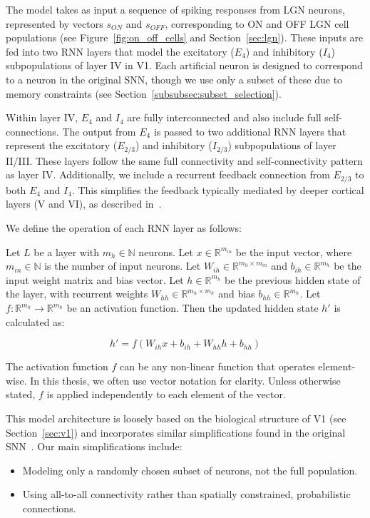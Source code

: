 The model takes as input a sequence of spiking responses from LGN neurons, represented by vectors $s_{ON}$ and $s_{OFF}$, corresponding to ON and OFF LGN cell populations (see Figure~\ref{fig:on_off_cells} and Section~\ref{sec:lgn}). These inputs are fed into two RNN layers that model the excitatory ($E_4$) and inhibitory ($I_4$) subpopulations of layer IV in V1. Each artificial neuron is designed to correspond to a neuron in the original SNN, though we use only a subset of these due to memory constraints (see Section~\ref{subsubsec:subset_selection}).

Within layer IV, $E_4$ and $I_4$ are fully interconnected and also include full self-connections. The output from $E_4$ is passed to two additional RNN layers that represent the excitatory ($E_{2/3}$) and inhibitory ($I_{2/3}$) subpopulations of layer II/III. These layers follow the same full connectivity and self-connectivity pattern as layer IV. Additionally, we include a recurrent feedback connection from $E_{2/3}$ to both $E_4$ and $I_4$. This simplifies the feedback typically mediated by deeper cortical layers (V and VI), as described in~\citet{antolik2024comprehensive}.

We define the operation of each RNN layer as follows:

\begin{defn}
    Let $L$ be a layer with $m_h \in \mathbb{N}$ neurons. Let $x \in \mathbb{R}^{m_{in}}$ be the input vector, where $m_{in} \in \mathbb{N}$ is the number of input neurons. Let $W_{ih} \in \mathbb{R}^{m_h \times m_{in}}$ and $b_{ih} \in \mathbb{R}^{m_h}$ be the input weight matrix and bias vector. Let $h \in \mathbb{R}^{m_h}$ be the previous hidden state of the layer, with recurrent weights $W_{hh} \in \mathbb{R}^{m_h \times m_h}$ and bias $b_{hh} \in \mathbb{R}^{m_h}$. Let $f: \mathbb{R}^{m_h} \to \mathbb{R}^{m_h}$ be an activation function. Then the updated hidden state $h'$ is calculated as:
    
    $$h' = f\left(W_{ih}x + b_{ih} + W_{hh}h + b_{hh}\right)$$
\end{defn}
\label{def:base_neuron}

The activation function $f$ can be any non-linear function that operates element-wise. In this thesis, we often use vector notation for clarity. Unless otherwise stated, $f$ is applied independently to each element of the vector.

This model architecture is loosely based on the biological structure of V1 (see Section~\ref{sec:v1}) and incorporates similar simplifications found in the original SNN~\citep{antolik2024comprehensive}. Our main simplifications include:
\begin{itemize}
    \item Modeling only a randomly chosen subset of neurons, not the full population.
    \item Using all-to-all connectivity rather than spatially constrained, probabilistic connections.
\end{itemize}

